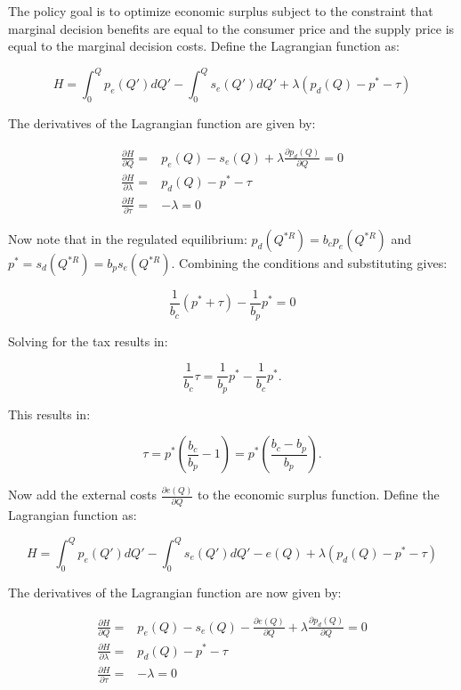 \documentclass[
]{book}
\begin{document}
The policy goal is to optimize economic surplus subject to the constraint that marginal decision benefits are equal to the consumer price and the supply price is equal to the marginal decision costs. Define the Lagrangian function as:

\begin{equation}
H = \int_0^Q p_e (Q')dQ' - \int^Q_0 s_e(Q')dQ' + \lambda (p_d(Q) - p^* - \tau)
\end{equation}

The derivatives of the Lagrangian function are given by:

\begin{align}
  \frac{\partial H}{\partial Q} =& p_e(Q) - s_e(Q) + \lambda \frac{\partial p_d(Q)}{\partial Q} = 0 \\
  \frac{\partial H}{\partial \lambda} =& p_d (Q) - p^* - \tau \\
  \frac{\partial H}{\partial \tau} =& -\lambda  =0
\end{align}

Now note that in the regulated equilibrium: \(p_d (Q^{*R} )=b_c p_e (Q^{*R} )\) and \(p^*=s_d (Q^{*R}) =b_p s_e (Q^{*R})\). Combining the conditions and substituting gives:

\begin{equation}
\frac{1}{b_c} (p^* + \tau) - \frac{1}{b_p}p^* = 0
\end{equation}

Solving for the tax results in:

\begin{equation}
\frac{1}{b_c} \tau = \frac{1}{b_p} p^* - \frac{1}{b_c} p^*.
\end{equation}

This results in:

\begin{equation}
\tau = p^* \left(\frac{b_c}{b_p} - 1 \right) = p^* \left(\frac{b_c - b_p}{b_p}\right).
\end{equation}

Now add the external costs \(\frac{\partial e(Q)}{\partial Q}\) to the economic surplus function. Define the Lagrangian function as:

\begin{equation}
H = \int_0^Q p_e (Q')dQ' - \int^Q_0 s_e(Q')dQ' - e(Q) + \lambda (p_d(Q) - p^* - \tau)
\end{equation}

The derivatives of the Lagrangian function are now given by:

\begin{align}
  \frac{\partial H}{\partial Q} =& p_e(Q) - s_e(Q) -\frac{\partial e(Q)}{\partial Q} + \lambda \frac{\partial p_d(Q)}{\partial Q} = 0 \\
  \frac{\partial H}{\partial \lambda} =& p_d (Q) - p^* - \tau \\
  \frac{\partial H}{\partial \tau} =& -\lambda  =0
\end{align}
\end{document}
